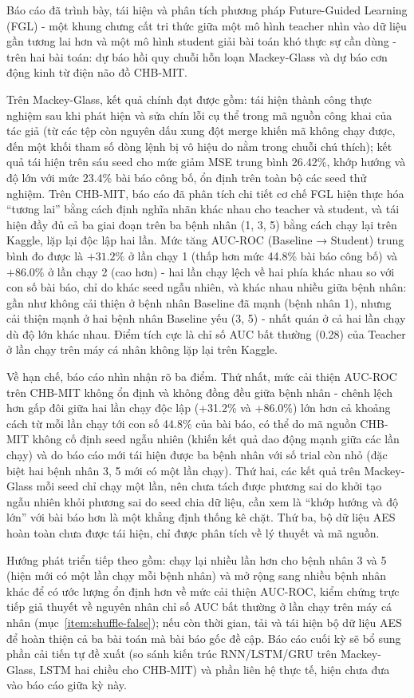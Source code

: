 
Báo cáo đã trình bày, tái hiện và phân tích phương pháp Future-Guided Learning (FGL) - một
khung chưng cất tri thức giữa một mô hình teacher nhìn vào dữ liệu gần tương lai hơn và một mô
hình student giải bài toán khó thực sự cần dùng - trên hai bài toán: dự báo hồi quy chuỗi
hỗn loạn Mackey-Glass và dự báo cơn động kinh từ điện não đồ CHB-MIT.

Trên Mackey-Glass, kết quả chính đạt được gồm: tái hiện thành công thực nghiệm sau khi phát
hiện và sửa chín lỗi cụ thể trong mã nguồn công khai của tác giả (từ các tệp còn nguyên dấu xung
đột merge khiến mã không chạy được, đến một khối tham số dòng lệnh bị vô hiệu do nằm trong
chuỗi chú thích); kết quả tái hiện trên sáu seed cho mức giảm MSE trung bình 26.42\%, khớp
hướng và độ lớn với mức 23.4\% bài báo công bố, ổn định trên toàn bộ các seed thử nghiệm. Trên
CHB-MIT, báo cáo đã phân tích chi tiết cơ chế FGL hiện thực hóa ``tương lai'' bằng cách định
nghĩa nhãn khác nhau cho teacher và student, và tái hiện đầy đủ cả ba giai đoạn trên ba bệnh
nhân (1, 3, 5) bằng cách chạy lại trên Kaggle, lặp lại độc lập hai lần. Mức tăng AUC-ROC
(Baseline → Student) trung bình đo được là $+31.2\%$ ở lần chạy 1 (thấp hơn mức 44.8\% bài báo
công bố) và $+86.0\%$ ở lần chạy 2 (cao hơn) - hai lần chạy lệch về hai phía khác nhau so với
con số bài báo, chỉ do khác seed ngẫu nhiên, và khác nhau nhiều giữa bệnh nhân: gần như không
cải thiện ở bệnh nhân Baseline đã mạnh (bệnh nhân 1), nhưng cải thiện mạnh ở hai bệnh nhân
Baseline yếu (3, 5) - nhất quán ở cả hai lần chạy dù độ lớn khác nhau. Điểm tích cực là chỉ số
AUC bất thường (0.28) của Teacher ở lần chạy trên máy cá nhân không lặp lại trên Kaggle.

Về hạn chế, báo cáo nhìn nhận rõ ba điểm. Thứ nhất, mức cải thiện AUC-ROC trên CHB-MIT không
ổn định và không đồng đều giữa bệnh nhân - chênh lệch hơn gấp đôi giữa hai lần chạy độc lập
(+31.2\% và +86.0\%) lớn hơn cả khoảng cách từ mỗi lần chạy tới con số 44.8\% của bài báo, có
thể do mã nguồn CHB-MIT không cố định seed ngẫu nhiên (khiến kết quả dao động mạnh giữa các
lần chạy) và do báo cáo mới tái hiện được ba bệnh nhân với số trial còn nhỏ (đặc biệt hai bệnh
nhân 3, 5 mới có một lần chạy). Thứ hai, các kết quả trên Mackey-Glass mỗi seed chỉ chạy một
lần, nên chưa tách được phương sai do khởi tạo ngẫu nhiên khỏi phương sai do seed chia dữ liệu,
cần xem là ``khớp hướng và độ lớn'' với bài báo hơn là một khẳng định thống kê chặt. Thứ ba, bộ
dữ liệu AES hoàn toàn chưa được tái hiện, chỉ được phân tích về lý thuyết và mã nguồn.

Hướng phát triển tiếp theo gồm: chạy lại nhiều lần hơn cho bệnh nhân 3 và 5 (hiện mới có một
lần chạy mỗi bệnh nhân) và mở rộng sang nhiều bệnh nhân khác để có ước lượng ổn định hơn về mức
cải thiện AUC-ROC, kiểm chứng trực tiếp giả thuyết về nguyên nhân chỉ số AUC bất thường ở lần
chạy trên máy cá nhân (mục~\ref{item:shuffle-false}); nếu còn thời gian, tải và tái hiện bộ dữ
liệu AES để hoàn thiện cả ba bài toán mà bài báo gốc đề cập. Báo cáo cuối kỳ sẽ bổ sung phần
cải tiến tự đề xuất (so sánh kiến trúc RNN/LSTM/GRU trên Mackey-Glass, LSTM hai chiều cho
CHB-MIT) và phần liên hệ thực tế, hiện chưa đưa vào báo cáo giữa kỳ này.
